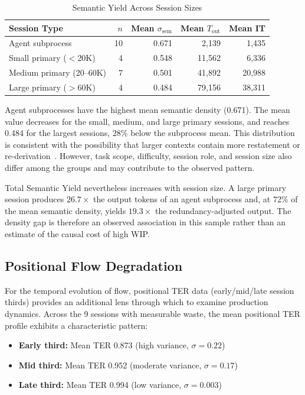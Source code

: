 \documentclass[journal]{IEEEtran}
\begin{document}
\begin{table}[t]
\centering
\caption{Semantic Yield Across Session Sizes}
\label{tab:info_throughput}
\begin{tabular}{@{}lrrrr@{}}
\toprule
\textbf{Session Type} & $n$ & \textbf{Mean} $\sigma_{\text{sem}}$ & \textbf{Mean} $T_{\text{out}}$ & \textbf{Mean IT} \\
\midrule
Agent subprocess      & 10  & 0.671 & 2,139  & 1,435  \\
Small primary ($<$20K) & 4  & 0.548 & 11,562 & 6,336  \\
Medium primary (20--60K) & 7 & 0.501 & 41,892 & 20,988 \\
Large primary ($>$60K)  & 4 & 0.484 & 79,156 & 38,311 \\
\bottomrule
\end{tabular}
\end{table}

Agent subprocesses have the highest mean semantic density (0.671). The mean value decreases for the small, medium, and large primary sessions, and reaches 0.484 for the largest sessions, 28\% below the subprocess mean. This distribution is consistent with the possibility that larger contexts contain more restatement or re-derivation~\cite{liu2024}. However, task scope, difficulty, session role, and session size also differ among the groups and may contribute to the observed pattern.

Total Semantic Yield nevertheless increases with session size. A large primary session produces $26.7\times$ the output tokens of an agent subprocess and, at 72\% of the mean semantic density, yields $19.3\times$ the redundancy-adjusted output. The density gap is therefore an observed association in this sample rather than an estimate of the causal cost of high WIP.

\subsection{Positional Flow Degradation}

For the temporal evolution of flow, positional TER data (early/mid/late session thirds) provides an additional lens through which to examine production dynamics. Across the 9 sessions with measurable waste, the mean positional TER profile exhibits a characteristic pattern:

\begin{itemize}[leftmargin=*, nosep]
  \item \textbf{Early third:} Mean TER 0.873 (high variance, $\sigma = 0.22$)
  \item \textbf{Mid third:} Mean TER 0.952 (moderate variance, $\sigma = 0.17$)
  \item \textbf{Late third:} Mean TER 0.994 (low variance, $\sigma = 0.003$)
\end{itemize}
\end{document}
